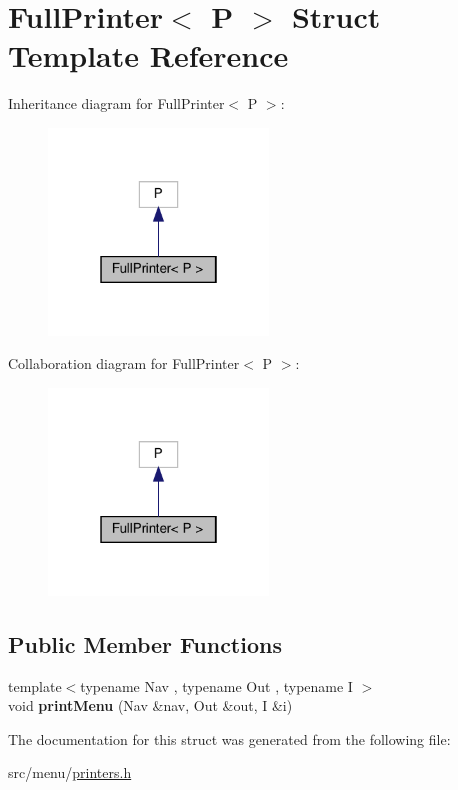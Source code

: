 \hypertarget{structFullPrinter}{}\section{Full\+Printer$<$ P $>$ Struct Template Reference}
\label{structFullPrinter}


Inheritance diagram for Full\+Printer$<$ P $>$\+:\nopagebreak
\begin{figure}[H]
\begin{center}
\leavevmode
\includegraphics[width=166pt]{structFullPrinter__inherit__graph}
\end{center}
\end{figure}


Collaboration diagram for Full\+Printer$<$ P $>$\+:\nopagebreak
\begin{figure}[H]
\begin{center}
\leavevmode
\includegraphics[width=166pt]{structFullPrinter__coll__graph}
\end{center}
\end{figure}
\subsection*{Public Member Functions}
\begin{DoxyCompactItemize}
\item 
\mbox{\label{structFullPrinter_a9085caa4340c10c5a42b66b168a7d29c}} 
{\footnotesize template$<$typename Nav , typename Out , typename I $>$ }\\void {\bfseries print\+Menu} (Nav \&nav, Out \&out, I \&i)
\end{DoxyCompactItemize}


The documentation for this struct was generated from the following file\+:\begin{DoxyCompactItemize}
\item 
src/menu/\hyperlink{printers_8h}{printers.\+h}\end{DoxyCompactItemize}
